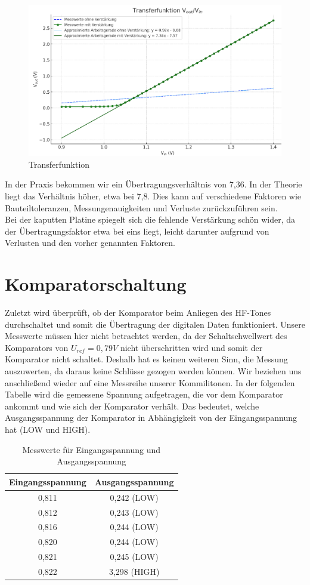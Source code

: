 \begin{figure}[H]
    \centering
    \includegraphics[width=1\textwidth]{Pictures/Transferfunktion.jpf.png}
    \caption{Transferfunktion}
    \label{fig:opamp_schaltung}
\end{figure}
In der Praxis bekommen wir ein Übertragungsverhältnis von 7,36.
In der Theorie liegt das Verhältnis höher, etwa bei 7,8. 
Dies kann auf verschiedene Faktoren wie Bauteiltoleranzen, Messungenauigkeiten und Verluste zurückzuführen sein.
\\
Bei der kaputten Platine spiegelt sich die fehlende Verstärkung schön wider, da der Übertragungsfaktor etwa bei eins liegt,
leicht darunter aufgrund von Verlusten und den vorher genannten Faktoren.

\section{Komparatorschaltung} %
Zuletzt wird überprüft, ob der Komparator beim Anliegen des HF-Tones durchschaltet und somit die Übertragung der digitalen Daten funktioniert.
Unsere Messwerte müssen hier nicht betrachtet werden, da der Schaltschwellwert des Komparators von
$U_{ref}= 0,79V$ nicht überschritten wird und somit der Komparator nicht schaltet. Deshalb hat es keinen weiteren Sinn, die Messung auszuwerten, da daraus keine Schlüsse gezogen werden können.
Wir beziehen uns anschließend wieder auf eine Messreihe unserer Kommilitonen. In der folgenden Tabelle wird die gemessene Spannung
aufgetragen, die vor dem Komparator ankommt und wie sich der Komparator verhält. Das bedeutet, welche Ausgangsspannung
der Komparator in Abhängigkeit von der Eingangsspannung hat (LOW und HIGH).

\begin{table}[h]
\centering
\begin{tabular}{cc}
\textbf{Eingangsspannung} & \textbf{Ausgangsspannung} \\
\hline
0{,}811 & 0{,}242 (LOW) \\
0{,}812 & 0{,}243 (LOW) \\
0{,}816 & 0{,}244 (LOW) \\
0{,}820 & 0{,}244 (LOW) \\
0{,}821 & 0{,}245 (LOW) \\
0{,}822 & 3{,}298 (HIGH) \\
\end{tabular}
\caption{Messwerte für Eingangsspannung und Ausgangsspannung}
\end{table}

